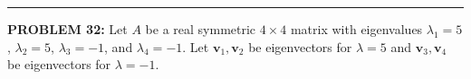 \documentclass[12pt]{amsart}
\newcommand{\divider}{
  \vspace{-1em} %
  \noindent
  \raisebox{-0.15ex}{\textbullet}%
  \hspace{0.5em}%
  \rule[0.5ex]{0.95\textwidth}{1.0pt}%
  \hspace{0.5em}%
  \raisebox{-0.15ex}{\textbullet}%
  \vspace{0em} %
}
\begin{document}
{%

\divider


\newpage


{\bf PROBLEM 32:}
% 
Let $A$ be a real symmetric $4 \times 4$ matrix with eigenvalues $\lambda_1 = 5$, $\lambda_2 = 5$, $\lambda_3 = -1$, and $\lambda_4 = -1$.
% 
Let $\mathbf{v}_1, \mathbf{v}_2$ be eigenvectors for $\lambda = 5$ and $\mathbf{v}_3, \mathbf{v}_4$ be eigenvectors for $\lambda = -1$.

}
\end{document}
